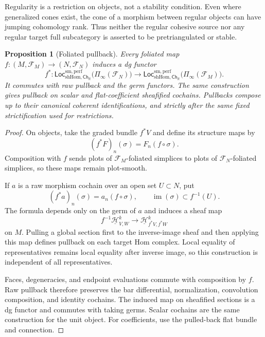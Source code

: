 \documentclass[12pt]{amsart}
\newtheorem{prop}[thm]{Proposition}
\theoremstyle{definition}
\theoremstyle{remark}
\numberwithin{equation}{section}
\newcommand{\CF}{{\mathcal F}}
\newcommand{\R}{{\mathbb{R}}}
\newcommand{\1}{{\mathbb{1}}}
\newcommand{\Ch}{\mathsf{Ch}}
\newcommand{\Loc}{\mathsf{Loc}}
\begin{document}
Regularity is a restriction on objects, not a stability condition.
Even where generalized cones exist, the cone of a morphism between
regular objects can have jumping cohomology rank.  Thus neither
the regular cohesive source nor any regular target full subcategory
is asserted to be pretriangulated or stable.

\begin{prop}[Foliated pullback]\label{prop:sheafified-pullback}
Every foliated map
$f:(M,\CF_M)\to(N,\CF_N)$ induces a dg functor
\[
 f^*:
 \Loc_{\mathrm{shHom},\Ch_{\R}}^{\mathrm{sm,perf}}
 \bigl(\Pi_\infty(\CF_N)\bigr)
 \longrightarrow
 \Loc_{\mathrm{shHom},\Ch_{\R}}^{\mathrm{sm,perf}}
 \bigl(\Pi_\infty(\CF_M)\bigr).
\]
It commutes with raw pullback and the germ functors.  The same
construction gives pullback on scalar and flat-coefficient sheafified
cochains.  Pullbacks compose up to their canonical coherent
identifications, and strictly after the same fixed strictification
used for restrictions.
\end{prop}

\begin{proof}
On objects, take the graded bundle $f^*V$ and define its structure maps
by
\[
 (f^*F)_n(\sigma)=F_n(f\circ\sigma).
\]
Composition with $f$ sends plots of $\CF_M$-foliated simplices to plots
of $\CF_N$-foliated simplices, so these maps remain plot-smooth.

If $a$ is a raw morphism cochain over an open set $U\subset N$, put
\[
 (f^*a)_n(\sigma)=a_n(f\circ\sigma),
 \qquad
 \operatorname{im}(\sigma)\subset f^{-1}(U).
\]
The formula depends only on the germ of $a$ and induces a sheaf map
\[
 f^{-1}\underline{\mathcal H}^{k}_{V,W}
 \longrightarrow
 \underline{\mathcal H}^{k}_{f^*V,f^*W}
\]
on $M$.  Pulling a global section first to the inverse-image sheaf and
then applying this map defines pullback on each target Hom complex.
Local equality of representatives remains local equality after inverse
image, so this construction is independent of all representatives.

Faces, degeneracies, and endpoint evaluations commute with composition
by $f$.  Raw pullback therefore preserves the bar differential,
normalization, convolution composition, and identity cochains.  The
induced map on sheafified sections is a dg functor and commutes with
taking germs.  Scalar cochains are the same construction for the unit
object.  For coefficients, use the pulled-back flat bundle and
connection.
\end{proof}
\end{document}
